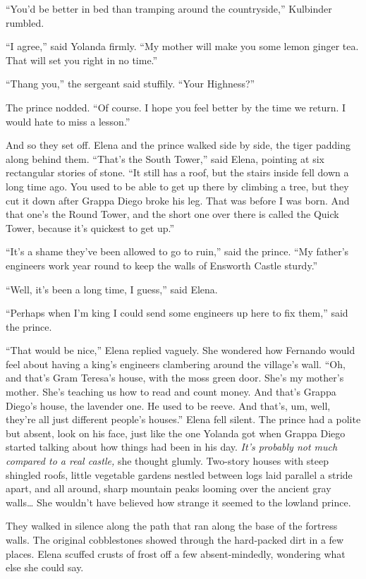 \documentclass[10pt]{book}
\begin{document}
``You'd be better in bed than tramping around the countryside,'' Kulbinder rumbled.

``I agree,'' said Yolanda firmly. ``My mother will make you some lemon ginger tea. That will set you right in no time.''

``Thang you,'' the sergeant said stuffily. ``Your Highness?''

The prince nodded. ``Of course. I hope you feel better by the time we return. I would hate to miss a lesson.''

And so they set off. Elena and the prince walked side by side, the tiger padding along behind them. ``That's the South Tower,'' said Elena, pointing at six rectangular stories of stone. ``It still has a roof, but the stairs inside fell down a long time ago. You used to be able to get up there by climbing a tree, but they cut it down after Grappa Diego broke his leg. That was before I was born. And that one's the Round Tower, and the short one over there is called the Quick Tower, because it's quickest to get up.''

``It's a shame they've been allowed to go to ruin,'' said the prince. ``My father's engineers work year round to keep the walls of Ensworth Castle sturdy.''

``Well, it's been a long time, I guess,'' said Elena.

``Perhaps when I'm king I could send some engineers up here to fix them,'' said the prince.

``That would be nice,'' Elena replied vaguely. She wondered how Fernando would feel about having a king's engineers clambering around the village's wall. ``Oh, and that's Gram Teresa's house, with the moss green door. She's my mother's mother. She's teaching us how to read and count money. And that's Grappa Diego's house, the lavender one. He used to be reeve. And that's, um, well, they're all just different people's houses.'' Elena fell silent. The prince had a polite but absent, look on his face, just like the one Yolanda got when Grappa Diego started talking about how things had been in his day. \emph{It's probably not much compared to a real castle,} she thought glumly. Two-story houses with steep shingled roofs, little vegetable gardens nestled between logs laid parallel a stride apart, and all around, sharp mountain peaks looming over the ancient gray walls{\ldots} She wouldn't have believed how strange it seemed to the lowland prince.

They walked in silence along the path that ran along the base of the fortress walls. The original cobblestones showed through the hard-packed dirt in a few places. Elena scuffed crusts of frost off a few absent-mindedly, wondering what else she could say.
\end{document}
